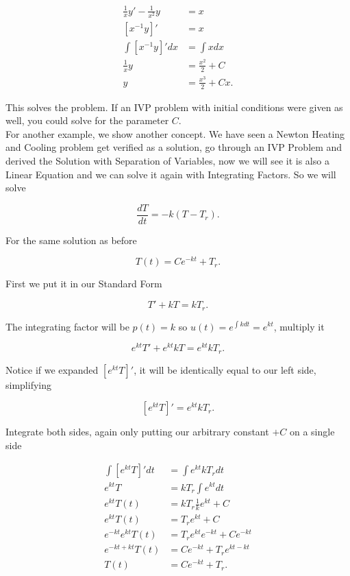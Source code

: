 \documentclass[12pt]{article}
\begin{document}
\begin{align*}
    \frac{1}{x}y' - \frac{1}{x^2}y &= x \\
    [x^{-1}y]' &= x \\
    \int [x^{-1}y]' dx &= \int x dx \\
    \frac{1}{x}y &= \frac{x^2}{2}+C \\
    y &= \frac{x^3}{2}+Cx.
\end{align*}

This solves the problem. If an IVP problem with initial conditions were given as well, you could solve for the parameter $C$. \\

For another example, we show another concept. We have seen a Newton Heating and Cooling problem get verified as a solution, go through an IVP Problem and derived the Solution with Separation of Variables, now we will see it is also a Linear Equation and we can solve it again with Integrating Factors. So we will solve

\begin{equation*}
    \frac{dT}{dt}=-k(T-T_r).
\end{equation*}

For the same solution as before

\begin{equation*}
    T(t)=Ce^{-kt}+T_r.
\end{equation*}

First we put it in our Standard Form

\begin{equation*}
    T'+kT=kT_r.
\end{equation*}

The integrating factor will be $p(t)=k$ so $u(t)=e^{\int k dt}=e^{kt}$, multiply it

\begin{equation*}
    e^{kt}T'+e^{kt}kT=e^{kt}kT_r.
\end{equation*}

Notice if we expanded $\left[ e^{kt} T \right]'$, it will be identically equal to our left side, simplifying

\begin{equation*}
    \left[ e^{kt} T \right]'=e^{kt}kT_r.
\end{equation*}

Integrate both sides, again only putting our arbitrary constant $+C$ on a single side

\begin{align*}
    \int \left[ e^{kt} T \right]' dt &= \int e^{kt}kT_r dt \\
    e^{kt} T &= kT_r\int e^{kt} dt \\
    e^{kt}T(t) &= kT_r \frac{1}{k}e^{kt} + C \\
    e^{kt}T(t) &= T_r e^{kt} + C \\
    e^{-kt}e^{kt}T(t) &= T_r e^{kt}e^{-kt} + Ce^{-kt} \\
    e^{-kt+kt}T(t) &= Ce^{-kt} + T_r e^{kt-kt} \\
    T(t) &=  Ce^{-kt} + T_r.
\end{align*}
\end{document}
